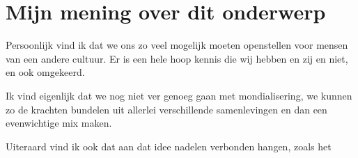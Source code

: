 \documentclass[12pt, a4paper]{paper}
\begin{document}

\section{Mijn mening over dit onderwerp}

Persoonlijk vind ik dat we ons zo veel mogelijk moeten openstellen voor mensen van een andere cultuur. Er is een hele hoop kennis die wij hebben en zij en niet, en ook omgekeerd.

Ik vind eigenlijk dat we nog niet ver genoeg gaan met mondialisering, we kunnen zo de krachten bundelen uit allerlei verschillende samenlevingen en dan een evenwichtige mix maken.

Uiteraard vind ik ook dat aan dat idee nadelen verbonden hangen, zoals het

\end{document}

